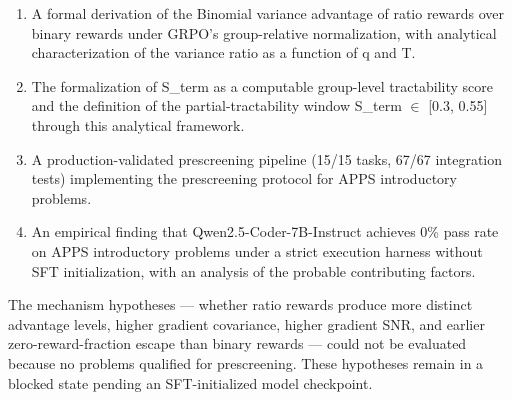 \begin{enumerate}
\item A formal derivation of the Binomial variance advantage of ratio rewards over binary rewards under GRPO's group-relative normalization, with analytical characterization of the variance ratio as a function of q and T.
\item The formalization of S\_term as a computable group-level tractability score and the definition of the partial-tractability window S\_term $\in$ [0.3, 0.55] through this analytical framework.
\item A production-validated prescreening pipeline (15/15 tasks, 67/67 integration tests) implementing the prescreening protocol for APPS introductory problems.
\item An empirical finding that Qwen2.5-Coder-7B-Instruct achieves 0\% pass rate on APPS introductory problems under a strict execution harness without SFT initialization, with an analysis of the probable contributing factors.
\end{enumerate}

The mechanism hypotheses --- whether ratio rewards produce more distinct advantage levels, higher gradient covariance, higher gradient SNR, and earlier zero-reward-fraction escape than binary rewards --- could not be evaluated because no problems qualified for prescreening. These hypotheses remain in a blocked state pending an SFT-initialized model checkpoint.

